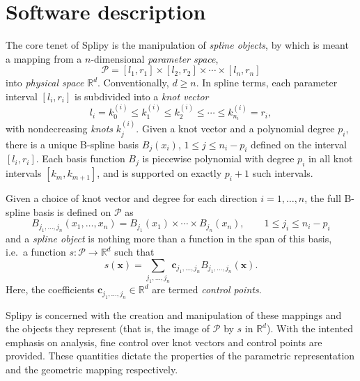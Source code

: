 \documentclass[preprint,12pt, a4paper]{elsarticle}
\begin{document}
\section{Software description}
\label{sec:description}

The core tenet of Splipy is the manipulation of \emph{spline objects}, by which is meant a mapping from a $n$-dimensional \emph{parameter space},
\begin{equation}
  \label{eqn:paramspace}
  \mathcal{P} = [l_1, r_1] \times [l_2, r_2] \times \cdots \times [l_n, r_n]
\end{equation}
into \emph{physical space} $\mathbb{R}^d$.
Conventionally, $d \geq n$.
In spline terms, each parameter interval $[l_i, r_i]$ is subdivided into a \emph{knot vector}
\begin{equation}
  \label{eqn:knotvector}
  l_i = k^{(i)}_0 \leq k^{(i)}_1 \leq k^{(i)}_2 \leq \cdots \leq k^{(i)}_{n_i} = r_i,
\end{equation}
with nondecreasing \emph{knots} $k^{(i)}_j$.
Given a knot vector and a polynomial degree $p_i$, there is a unique B-spline basis $B_j(x_i)$, $1 \leq j \leq n_i - p_i$ defined on the interval $[l_i, r_i]$.
Each basis function $B_j$ is piecewise polynomial with degree $p_i$ in all knot intervals $[k_m, k_{m+1}]$, and is supported on exactly $p_i+1$ such intervals.

Given a choice of knot vector and degree for each direction $i=1,\ldots,n$, the full B-spline basis is defined on $\mathcal{P}$ as
\begin{equation}
  \label{eqn:bspline-multi}
  B_{j_1,\ldots,j_n}(x_1,\ldots,x_n) = B_{j_1}(x_1) \times \cdots \times B_{j_n}(x_n),
  \qquad 1 \leq j_i \leq n_i - p_i
\end{equation}
and a \emph{spline object} is nothing more than a function in the span of this basis, i.e.~a function $s: \mathcal{P} \to \mathbb{R}^d$ such that
\begin{equation}
  \label{eqn:splineobj}
  s(\bm x) = \sum_{j_1, \ldots, j_n} \bm c_{j_1, \ldots, j_n} B_{j_1, \ldots, j_n}(\bm x).
\end{equation}
Here, the coefficients $\bm c_{j_1, \ldots, j_n} \in \mathbb{R}^d$ are termed \emph{control points}.

Splipy is concerned with the creation and manipulation of these mappings and the objects they represent (that is, the image of $\mathcal{P}$ by $s$ in $\mathbb{R}^d$).
With the intented emphasis on analysis, fine control over knot vectors and control points are provided.
These quantities dictate the properties of the parametric representation and the geometric mapping respectively.
\end{document}
